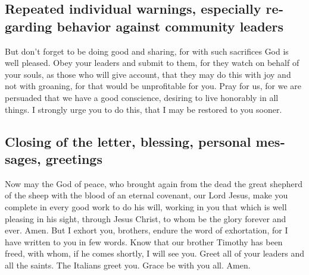 \begin{paracol}{2}
\begin{otherlanguage}{english}
\hypertarget{repeated-individual-warnings-especially-regarding-behavior-against-community-leaders}{%
\subsection{Repeated individual warnings, especially regarding behavior
against community
leaders}\label{repeated-individual-warnings-especially-regarding-behavior-against-community-leaders}}

 But don't forget to be doing good and sharing, for with
such sacrifices God is well pleased.  Obey your leaders
and submit to them, for they watch on behalf of your souls, as those who
will give account, that they may do this with joy and not with groaning,
for that would be unprofitable for you.  Pray for us, for
we are persuaded that we have a good conscience, desiring to live
honorably in all things.  I strongly urge you to do this,
that I may be restored to you sooner.

\hypertarget{closing-of-the-letter-blessing-personal-messages-greetings}{%
\subsection{Closing of the letter, blessing, personal messages,
greetings}\label{closing-of-the-letter-blessing-personal-messages-greetings}}

 Now may the God of peace, who brought again from the
dead the great shepherd of the sheep with the blood of an eternal
covenant, our Lord Jesus,  make you complete in every
good work to do his will, working in you that which is well pleasing in
his sight, through Jesus Christ, to whom be the glory forever and ever.
Amen.  But I exhort you, brothers, endure the word of
exhortation, for I have written to you in few words. 
Know that our brother Timothy has been freed, with whom, if he comes
shortly, I will see you.  Greet all of your leaders and
all the saints. The Italians greet you.  Grace be with
you all. Amen. \end{otherlanguage} \end{paracol}
